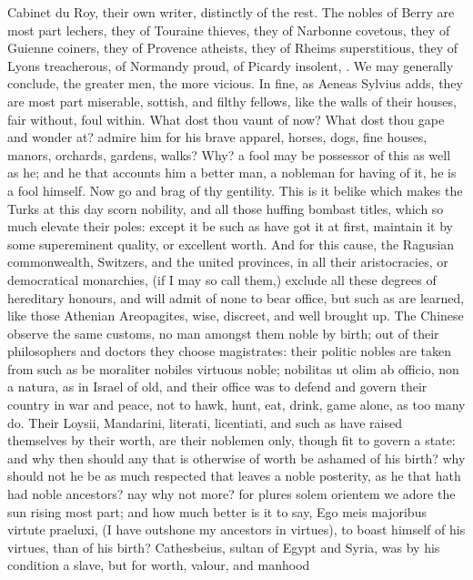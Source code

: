 {Cabinet du Roy, their own writer, distinctly of the rest. The nobles of
Berry are most part lechers, they of Touraine thieves, they of Narbonne
covetous, they of Guienne coiners, they of Provence atheists, they of
Rheims superstitious, they of Lyons treacherous, of Normandy proud, of
Picardy insolent, \etc{}. We may generally conclude, the greater men, the
more vicious. In fine, as Aeneas Sylvius adds, they are most part
miserable, sottish, and filthy fellows, like the walls of their houses,
fair without, foul within. What dost thou vaunt of now? What dost
thou gape and wonder at? admire him for his brave apparel, horses,
dogs, fine houses, manors, orchards, gardens, walks? Why? a fool may be
possessor of this as well as he; and he that accounts him a better man,
a nobleman for having of it, he is a fool himself. Now go and brag of
thy gentility. This is it belike which makes the Turks at this
day scorn nobility, and all those huffing bombast titles, which so much
elevate their poles: except it be such as have got it at first,
maintain it by some supereminent quality, or excellent worth. And for
this cause, the Ragusian commonwealth, Switzers, and the united
provinces, in all their aristocracies, or democratical monarchies, (if
I may so call them,) exclude all these degrees of hereditary honours,
and will admit of none to bear office, but such as are learned, like
those Athenian Areopagites, wise, discreet, and well brought up. The
Chinese observe the same customs, no man amongst them noble by
birth; out of their philosophers and doctors they choose magistrates:
their politic nobles are taken from such as be moraliter nobiles
virtuous noble; nobilitas ut olim ab officio, non a natura, as in
Israel of old, and their office was to defend and govern their country
in war and peace, not to hawk, hunt, eat, drink, game alone, as too
many do. Their Loysii, Mandarini, literati, licentiati, and such as
have raised themselves by their worth, are their noblemen only, though
fit to govern a state: and why then should any that is otherwise of
worth be ashamed of his birth? why should not he be as much respected
that leaves a noble posterity, as he that hath had noble ancestors? nay
why not more? for plures solem orientem we adore the sun rising most
part; and how much better is it to say, Ego meis majoribus virtute
praeluxi, (I have outshone my ancestors in virtues), to boast himself
of his virtues, than of his birth? Cathesbeius, sultan of Egypt and
Syria, was by his condition a slave, but for worth, valour, and manhood
}
